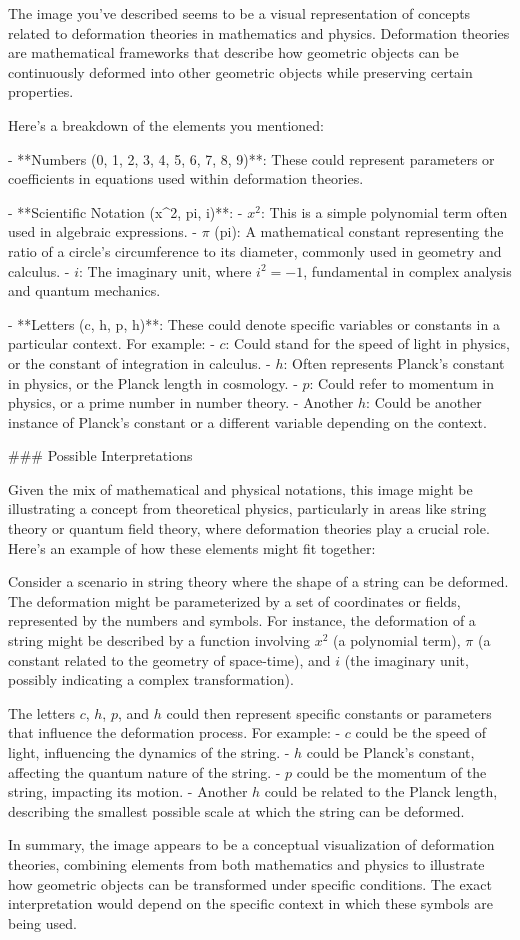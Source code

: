 The image you've described seems to be a visual representation of concepts related to deformation theories in mathematics and physics. Deformation theories are mathematical frameworks that describe how geometric objects can be continuously deformed into other geometric objects while preserving certain properties.

Here's a breakdown of the elements you mentioned:

- **Numbers (0, 1, 2, 3, 4, 5, 6, 7, 8, 9)**: These could represent parameters or coefficients in equations used within deformation theories.
  
- **Scientific Notation (x^2, pi, i)**:
  - \(x^2\): This is a simple polynomial term often used in algebraic expressions.
  - \(\pi\) (pi): A mathematical constant representing the ratio of a circle's circumference to its diameter, commonly used in geometry and calculus.
  - \(i\): The imaginary unit, where \(i^2 = -1\), fundamental in complex analysis and quantum mechanics.

- **Letters (c, h, p, h)**: These could denote specific variables or constants in a particular context. For example:
  - \(c\): Could stand for the speed of light in physics, or the constant of integration in calculus.
  - \(h\): Often represents Planck's constant in physics, or the Planck length in cosmology.
  - \(p\): Could refer to momentum in physics, or a prime number in number theory.
  - Another \(h\): Could be another instance of Planck's constant or a different variable depending on the context.

### Possible Interpretations

Given the mix of mathematical and physical notations, this image might be illustrating a concept from theoretical physics, particularly in areas like string theory or quantum field theory, where deformation theories play a crucial role. Here’s an example of how these elements might fit together:

Consider a scenario in string theory where the shape of a string can be deformed. The deformation might be parameterized by a set of coordinates or fields, represented by the numbers and symbols. For instance, the deformation of a string might be described by a function involving \(x^2\) (a polynomial term), \(\pi\) (a constant related to the geometry of space-time), and \(i\) (the imaginary unit, possibly indicating a complex transformation).

The letters \(c\), \(h\), \(p\), and \(h\) could then represent specific constants or parameters that influence the deformation process. For example:
- \(c\) could be the speed of light, influencing the dynamics of the string.
- \(h\) could be Planck's constant, affecting the quantum nature of the string.
- \(p\) could be the momentum of the string, impacting its motion.
- Another \(h\) could be related to the Planck length, describing the smallest possible scale at which the string can be deformed.

In summary, the image appears to be a conceptual visualization of deformation theories, combining elements from both mathematics and physics to illustrate how geometric objects can be transformed under specific conditions. The exact interpretation would depend on the specific context in which these symbols are being used.